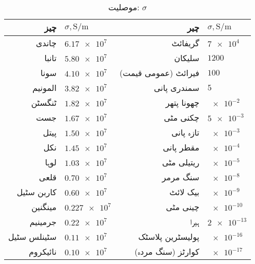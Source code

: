 {\renewcommand{\arraystretch}{1.2}
\begin{table}
\caption*{موصلیت: $\sigma$}
\centering
\begin{tabular}{r | l || r | l}
\hline 
چیز & $\sigma, \si{\siemens \per \meter}$ & چیر & $\sigma, \si{\siemens \per \meter}$\\
\hline
چاندی &$\num{6.17e7}$ &گریفائٹ & $\num{7e4}$\\
تانبا & $\num{5.80e7}$&سلیکان & $\num{1200}$\\
سونا & $\num{4.10e7}$&فیرائٹ (عمومی قیمت) &$\num{100}$ \\
المونیم &$\num{3.82e7}$ &سمندری پانی &$\num{5}$ \\
ٹنگسٹن &$\num{1.82e7}$ &چھونا پتھر &$\num{e-2}$ \\
جست & $\num{1.67e7}$& چکنی مٹی&$\num{5e-3}$ \\
پیتل &$\num{1.50e7}$ & تازہ پانی&$\num{e-3}$ \\
نکل &$\num{1.45e7}$ & مقطر پانی& $\num{e-4}$\\
لوہا &$\num{1.03e7}$ & ریتیلی مٹی & $\num{e-5}$\\
قلعی &$\num{0.70e7}$ &سنگ مرمر &$\num{e-8}$ \\
کاربن سٹیل & $\num{0.60e7}$& بیک لائٹ & $\num{e-9}$\\
مینگنین & $\num{0.227e7}$ & چینی مٹی &$\num{e-10}$ \\
جرمینیم & $\num{0.22e7}$& ہیرا&$\num{2e-13}$ \\
سٹینلس سٹیل &$\num{0.11e7}$ &پولیسٹرین پلاسٹک &$\num{e-16}$ \\
نائیکروم & $\num{0.10e7}$&کوارٹز (سنگ مردہ) &$\num{e-17}$ \\
\end{tabular}
\label{جدول_جدول_موصلیت_کے_مستقل}
\end{table}
}

